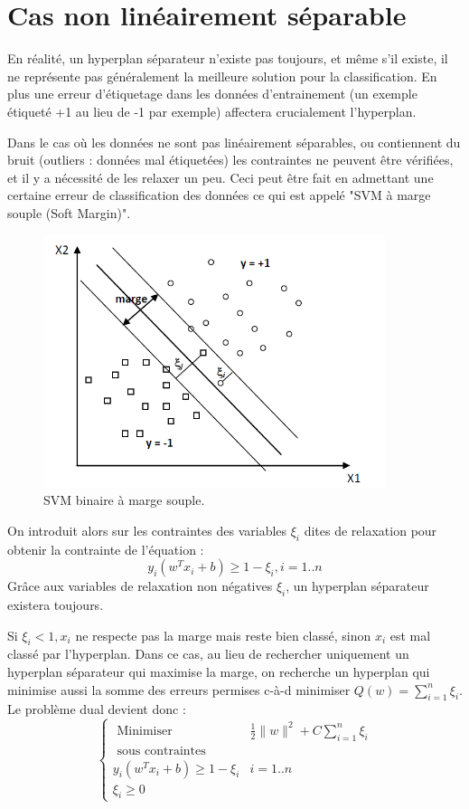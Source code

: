 \documentclass[12pt,a4paper]{report}
\begin{document}
\section{Cas non linéairement séparable}
En réalité, un hyperplan séparateur n'existe pas toujours, et même s'il existe, il ne représente pas généralement la meilleure solution pour la classification. En plus une erreur d'étiquetage dans les données d'entrainement (un exemple étiqueté +1 au lieu de -1 par exemple) affectera crucialement l'hyperplan.

Dans le cas où les données ne sont pas linéairement séparables, ou contiennent du bruit (outliers : données mal étiquetées) les contraintes ne peuvent être vérifiées, et il y a nécessité de les relaxer un peu. Ceci peut être fait en admettant une certaine erreur de classification des données ce qui est appelé "SVM à marge souple (Soft Margin)".

\begin{figure}[!ht]
	\centering
	\includegraphics[width=10cm]{images/capt1}
	\caption{SVM binaire à marge souple.}
\end{figure}

On introduit alors sur les contraintes des variables $\xi_{i}$ dites de relaxation pour obtenir la contrainte de l'équation :
$$
y_{i}\left(w^{T} x_{i}+b\right) \geq 1-\xi_{i}, i=1 . . n
$$
Grâce aux variables de relaxation non négatives $\xi_{i}$, un hyperplan séparateur existera toujours.

Si $\xi_{i}<1, x_{i}$ ne respecte pas la marge mais reste bien classé, sinon $x_{i}$ est mal classé par l'hyperplan. Dans ce cas, au lieu de rechercher uniquement un hyperplan séparateur qui maximise la marge, on recherche un hyperplan qui minimise aussi la somme des erreurs permises c-à-d minimiser $Q(w)=\sum_{i=1}^{n} \xi_{i}$.
Le problème dual devient donc :
$$
\begin{cases}\text { Minimiser } & \frac{1}{2}\|w\|^{2}+C \sum_{i=1}^{n} \xi_{i} \\ \text { sous contraintes } \\ y_{i}\left(w^{T} x_{i}+b\right) \geq 1-\xi_{i} & i=1 . . n \\ \xi_{i} \geq 0 & \end{cases}
$$
\end{document}
